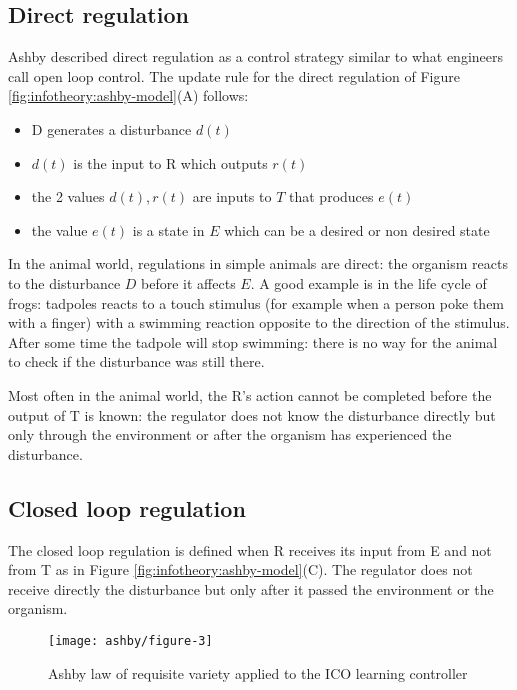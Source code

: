 \subsection{Direct regulation}
Ashby described direct regulation as a control strategy similar to what engineers
call open loop control.
The update rule for the direct regulation of Figure \ref{fig:infotheory:ashby-model}(A) follows:
\begin{itemize}
 \item D generates a disturbance $d(t)$
 \item $d(t)$ is the input to R which outputs $r(t)$
 \item the 2 values $d(t),r(t)$ are inputs to $T$ that produces $e(t)$
 \item the value $e(t)$ is a state in $E$ which can be a desired or non desired state
\end{itemize}
In the animal world, regulations in simple animals are direct: the organism reacts to the disturbance $D$ before it affects $E$.
A good example is in the life cycle of frogs: tadpoles reacts to a touch stimulus (for example
when a person poke them with a finger) with a swimming reaction opposite to the
direction of the stimulus.
After some time the tadpole will stop swimming: there is no way for the animal
to check if the disturbance was still there.

Most often in the animal world, the R's action cannot be completed before the output of T
is known: the regulator does not know the disturbance directly but only through
the environment or after the organism has experienced the disturbance.


\subsection{Closed loop regulation}
The closed loop regulation is defined when R receives its input from E and not from T
as in Figure \ref{fig:infotheory:ashby-model}(C).
The regulator does not receive directly the disturbance but only after it passed
the environment or the organism.

\begin{figure}
\begin{center}
\texttt{[image: ashby/figure-3]}
\caption[Ashby law in predictive controllers]{
Ashby law of requisite variety applied to the ICO learning controller
\label{fig:infotheory:ashby2}}
\end{center}
\end{figure}

